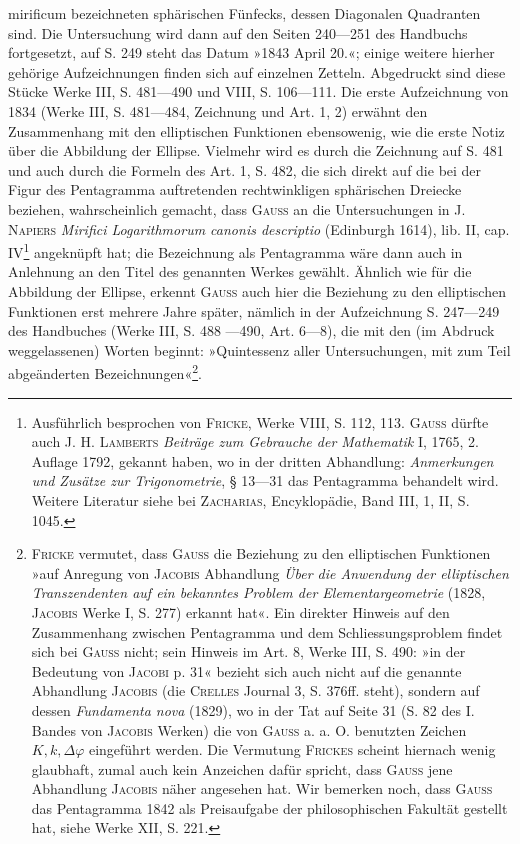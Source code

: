 mirificum bezeichneten sphärischen Fünfecks, dessen Diagonalen Quadranten
sind. Die Untersuchung wird dann auf den Seiten 240—251 des Handbuchs
fortgesetzt, auf S. 249 steht das Datum »1843 April 20.«; einige weitere
hierher gehörige Aufzeichnungen finden sich auf einzelnen Zetteln. Abgedruckt
sind diese Stücke Werke III, S. 481—490 und VIII, S. 106—111. Die erste
Aufzeichnung von 1834 (Werke III, S. 481—484, Zeichnung und Art. 1, 2)
erwähnt den Zusammenhang mit den elliptischen Funktionen ebensowenig, wie
die erste Notiz über die Abbildung der Ellipse. Vielmehr wird es durch die
Zeichnung auf S. 481 und auch durch die Formeln des Art. 1, S. 482, die
sich direkt auf die bei der Figur des Pentagramma auftretenden rechtwinkligen
sphärischen Dreiecke beziehen, wahrscheinlich gemacht, dass \textsc{Gauss} an
die Untersuchungen in \textsc{J. Napiers} \textit{Mirifici Logarithmorum canonis descriptio} (Edinburgh
1614), lib. II, cap. IV\footnote{Ausführlich besprochen von \textsc{Fricke}, Werke VIII, S. 112, 113. \textsc{Gauss} dürfte auch \textsc{J. H. Lamberts} \textit{Beiträge zum Gebrauche der Mathematik} I, 1765, 2. Auflage 1792, gekannt haben, wo in der dritten Abhandlung: \textit{Anmerkungen und Zusätze zur Trigonometrie}, § 13—31 das Pentagramma behandelt wird. Weitere Literatur siehe bei \textsc{Zacharias}, Encyklopädie, Band III, 1, II, S. 1045.} angeknüpft hat; die Bezeichnung als Pentagramma
 wäre dann auch in Anlehnung an den Titel des genannten Werkes
gewählt. Ähnlich wie für die Abbildung der Ellipse, erkennt \textsc{Gauss} auch
hier die Beziehung zu den elliptischen Funktionen erst mehrere Jahre später,
nämlich in der Aufzeichnung S. 247—249 des Handbuches (Werke III, S. 488
—490, Art. 6—8), die mit den (im Abdruck weggelassenen) Worten beginnt:
»Quintessenz aller Untersuchungen, mit zum Teil abgeänderten Bezeichnungen«\footnote{\textsc{Fricke} vermutet, dass \textsc{Gauss} die Beziehung zu den elliptischen Funktionen »auf Anregung von \textsc{Jacobis} Abhandlung \textit{Über die Anwendung der elliptischen Transzendenten auf ein bekanntes Problem der Elementargeometrie} (1828, \textsc{Jacobis} Werke I, S. 277) erkannt hat«. Ein direkter Hinweis auf den Zusammenhang zwischen Pentagramma und dem Schliessungsproblem findet sich bei \textsc{Gauss} nicht; sein Hinweis im Art. 8, Werke III, S. 490: »in der Bedeutung von \textsc{Jacobi} p. 31« bezieht sich auch nicht auf die genannte Abhandlung \textsc{Jacobis} (die \textsc{Crelles} Journal 3, S. 376ff. steht), sondern auf dessen \textit{Fundamenta nova} (1829), wo in der Tat auf Seite 31 (S. 82 des I. Bandes von \textsc{Jacobis} Werken) die von \textsc{Gauss} a. a. O. benutzten Zeichen \(K,k,\Delta\varphi\) eingeführt werden. Die Vermutung \textsc{Frickes} scheint hiernach wenig glaubhaft, zumal auch kein Anzeichen dafür spricht, dass \textsc{Gauss} jene Abhandlung \textsc{Jacobis} näher angesehen hat. Wir bemerken noch, dass \textsc{Gauss} das Pentagramma 1842 als Preisaufgabe der philosophischen Fakultät gestellt hat, siehe Werke XII, S. 221.}.\par
